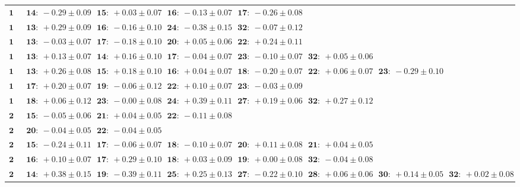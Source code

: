 \documentclass[letter]{article}
\begin{document}
\begin{landscape}
\begin{table}[!h]
\begin{tabular}{r|lllllll}
\hline
\( \mathbf{13} \)& \( \mathbf{14:}~-0.29 \pm 0.09 \)& \( \mathbf{15:}~+0.03 \pm 0.07 \)& \( \mathbf{16:}~-0.13 \pm 0.07 \)& \( \mathbf{17:}~-0.26 \pm 0.08 \)\\ 
\( \mathbf{14} \)& \( \mathbf{13:}~+0.29 \pm 0.09 \)& \( \mathbf{16:}~-0.16 \pm 0.10 \)& \( \mathbf{24:}~-0.38 \pm 0.15 \)& \( \mathbf{32:}~-0.07 \pm 0.12 \)\\ 
\( \mathbf{15} \)& \( \mathbf{13:}~-0.03 \pm 0.07 \)& \( \mathbf{17:}~-0.18 \pm 0.10 \)& \( \mathbf{20:}~+0.05 \pm 0.06 \)& \( \mathbf{22:}~+0.24 \pm 0.11 \)\\ 
\( \mathbf{16} \)& \( \mathbf{13:}~+0.13 \pm 0.07 \)& \( \mathbf{14:}~+0.16 \pm 0.10 \)& \( \mathbf{17:}~-0.04 \pm 0.07 \)& \( \mathbf{23:}~-0.10 \pm 0.07 \)& \( \mathbf{32:}~+0.05 \pm 0.06 \)\\ 
\( \mathbf{17} \)& \( \mathbf{13:}~+0.26 \pm 0.08 \)& \( \mathbf{15:}~+0.18 \pm 0.10 \)& \( \mathbf{16:}~+0.04 \pm 0.07 \)& \( \mathbf{18:}~-0.20 \pm 0.07 \)& \( \mathbf{22:}~+0.06 \pm 0.07 \)& \( \mathbf{23:}~-0.29 \pm 0.10 \)\\ 
\( \mathbf{18} \)& \( \mathbf{17:}~+0.20 \pm 0.07 \)& \( \mathbf{19:}~-0.06 \pm 0.12 \)& \( \mathbf{22:}~+0.10 \pm 0.07 \)& \( \mathbf{23:}~-0.03 \pm 0.09 \)\\ 
\( \mathbf{19} \)& \( \mathbf{18:}~+0.06 \pm 0.12 \)& \( \mathbf{23:}~-0.00 \pm 0.08 \)& \( \mathbf{24:}~+0.39 \pm 0.11 \)& \( \mathbf{27:}~+0.19 \pm 0.06 \)& \( \mathbf{32:}~+0.27 \pm 0.12 \)\\ 
\( \mathbf{20} \)& \( \mathbf{15:}~-0.05 \pm 0.06 \)& \( \mathbf{21:}~+0.04 \pm 0.05 \)& \( \mathbf{22:}~-0.11 \pm 0.08 \)\\ 
\( \mathbf{21} \)& \( \mathbf{20:}~-0.04 \pm 0.05 \)& \( \mathbf{22:}~-0.04 \pm 0.05 \)\\ 
\( \mathbf{22} \)& \( \mathbf{15:}~-0.24 \pm 0.11 \)& \( \mathbf{17:}~-0.06 \pm 0.07 \)& \( \mathbf{18:}~-0.10 \pm 0.07 \)& \( \mathbf{20:}~+0.11 \pm 0.08 \)& \( \mathbf{21:}~+0.04 \pm 0.05 \)\\ 
\( \mathbf{23} \)& \( \mathbf{16:}~+0.10 \pm 0.07 \)& \( \mathbf{17:}~+0.29 \pm 0.10 \)& \( \mathbf{18:}~+0.03 \pm 0.09 \)& \( \mathbf{19:}~+0.00 \pm 0.08 \)& \( \mathbf{32:}~-0.04 \pm 0.08 \)\\ 
\( \mathbf{24} \)& \( \mathbf{14:}~+0.38 \pm 0.15 \)& \( \mathbf{19:}~-0.39 \pm 0.11 \)& \( \mathbf{25:}~+0.25 \pm 0.13 \)& \( \mathbf{27:}~-0.22 \pm 0.10 \)& \( \mathbf{28:}~+0.06 \pm 0.06 \)& \( \mathbf{30:}~+0.14 \pm 0.05 \)& \( \mathbf{32:}~+0.02 \pm 0.08 \)\\ 

\end{tabular}
\end{table}
\end{landscape}
\end{document}
